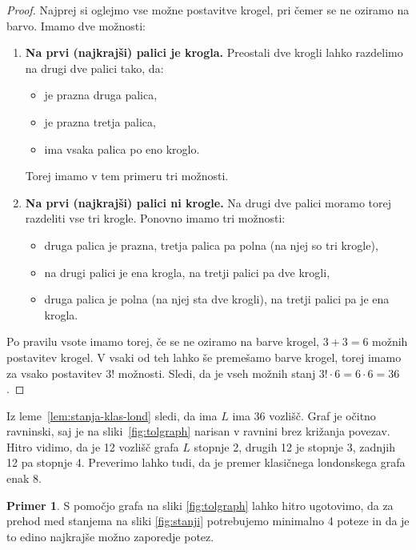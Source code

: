 \documentclass[12pt,a4paper]{amsart}
\theoremstyle{definition} %
\newtheorem{primer}[definicija]{Primer}
\theoremstyle{plain} %
\begin{document}
\begin{proof}
    Najprej si oglejmo vse možne postavitve krogel, pri čemer se ne oziramo na barvo.
    Imamo dve možnosti:
    \begin{enumerate}
        \item \textbf{Na prvi (najkrajši) palici je krogla.}
        Preostali dve krogli lahko razdelimo na drugi dve palici tako, da:
        \begin{itemize}[label={-}]
            \item je prazna druga palica,
            \item je prazna tretja palica,
            \item ima vsaka palica po eno kroglo.
        \end{itemize}
        Torej imamo v tem primeru tri možnosti.
        
        \item \textbf{Na prvi (najkrajši) palici ni krogle.}
        Na drugi dve palici moramo torej razdeliti vse tri krogle.
        Ponovno imamo tri možnosti:
        \begin{itemize}[label={-}]
            \item druga palica je prazna, tretja palica pa polna (na njej so tri krogle),
            \item na drugi palici je ena krogla, na tretji palici pa dve krogli,
            \item druga palica je polna (na njej sta dve krogli), na tretji palici pa je ena krogla.
        \end{itemize}
    \end{enumerate}
    Po pravilu vsote imamo torej, če se ne oziramo na barve krogel, $3+3=6$ možnih postavitev krogel.
    V vsaki od teh lahko še premešamo barve krogel, torej imamo za vsako postavitev $3!$ možnosti. Sledi, da je vseh možnih stanj $3! \cdot 6 = 6 \cdot 6 = 36$.\qedhere
\end{proof}

Iz leme~\ref{lem:stanja-klas-lond} sledi, da ima $L$ ima 36 vozlišč. Graf je očitno ravninski, saj je na sliki~\ref{fig:tolgraph} narisan v ravnini brez križanja povezav. Hitro vidimo, da je 12 vozlišč grafa $L$ stopnje 2, drugih 12 je stopnje 3, zadnjih 12 pa stopnje 4. Preverimo lahko tudi, da je premer klasičnega londonskega grafa enak 8.

\begin{primer}
    S pomočjo grafa na sliki \ref{fig:tolgraph} lahko hitro ugotovimo, da za prehod med stanjema na sliki \ref{fig:stanji} potrebujemo minimalno 4 poteze in da je to edino najkrajše možno zaporedje potez.
\end{primer}
\end{document}
